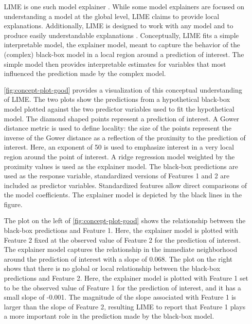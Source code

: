 \documentclass[AMS,STIX2COL]{WileyNJD-v2}\usepackage[]{graphicx}\usepackage[]{color}
\begin{document}
LIME is one such model explainer \citep{ribeiro:2016}. While some model explainers are focused on understanding a model at the global level, LIME claims to provide local explanations. Additionally, LIME is designed to work with any model and to produce easily understandable explanations \citep{ribeiro:2016}. Conceptually, LIME fits a simple interpretable model, the explainer model,  meant to capture the behavior of the (complex) black-box model in a local region around a prediction of interest. The  simple model then provides interpretable estimates for variables that most influenced the prediction made by the complex model.

\autoref{fig:concept-plot-good} provides a visualization of this conceptual understanding of LIME. The two plots show the predictions from a hypothetical black-box model plotted against the two predictor variables used to fit the hypothetical model. The diamond shaped points represent a prediction  of interest. A Gower distance metric \citep{gower:1971} is used to define locality: the size of the points represent the inverse of the Gower distance as a reflection of the proximity to the prediction of interest. Here, an exponent of 50 is used to emphasize interest in a very local region around the point of interest. A ridge regression model weighted by the proximity values is used as the explainer model. The black-box predictions are used as the response variable, standardized versions of Features 1 and 2 are included as predictor variables. Standardized features allow direct comparisons of the model coefficients. The explainer model is depicted by the black lines in the figure.

The plot on the left of \autoref{fig:concept-plot-good} shows the relationship between the black-box predictions and Feature 1.  Here, the explainer model is plotted with Feature 2 fixed at the observed value of Feature 2 for the prediction of interest. The explainer model captures the relationship in the immediate neighborhood around the prediction of interest  with a slope of 0.068. The plot on the right shows that there is no global or local relationship between the black-box predictions and Feature 2. Here, the explainer model is plotted with Feature 1 set to be the observed value of Feature 1 for the prediction of interest, and it has a small slope of -0.001. The magnitude of the slope associated with Feature 1 is larger than the slope of Feature 2, resulting LIME to report that Feature 1 plays a more important role in the prediction made by the black-box model.
\end{document}
